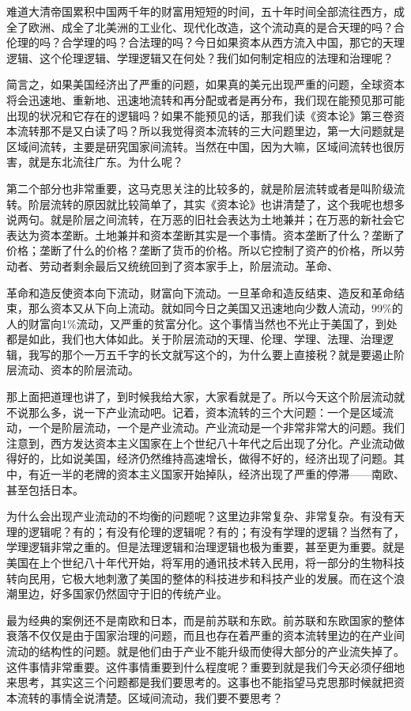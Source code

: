 \documentclass[UTF8, 12pt, a4paper]{ctexrep}
\begin{document}
难道大清帝国累积中国两千年的财富用短短的时间，五十年时间全部流往西方，成全了欧洲、成全了北美洲的工业化、现代化改造，这个流动真的是合天理的吗？合伦理的吗？合学理的吗？合法理的吗？今日如果资本从西方流入中国，那它的天理逻辑、这个伦理逻辑、学理逻辑又在何处？我们如何制定相应的法理和治理呢？

简言之，如果美国经济出了严重的问题，如果真的美元出现严重的问题，全球资本将会迅速地、重新地、迅速地流转和再分配或者是再分布，我们现在能预见那可能出现的状况和它存在的逻辑吗？如果不能预见的话，那我们读《资本论》第三卷资本流转那不是又白读了吗？所以我觉得资本流转的三大问题里边，第一大问题就是区域间流转，主要是研究国家间流转。当然在中国，因为大嘛，区域间流转也很厉害，就是东北流往广东。为什么呢？

第二个部分也非常重要，这马克思关注的比较多的，就是阶层流转或者是叫阶级流转。阶层流转的原因就比较简单了，其实《资本论》也讲清楚了，这个我呢也想多说两句。就是阶层之间流转，在万恶的旧社会表达为土地兼并；在万恶的新社会它表达为资本垄断。土地兼并和资本垄断其实是一个事情。资本垄断了什么？垄断了价格；垄断了什么的价格？垄断了货币的价格。所以它控制了资产的价格，所以劳动者、劳动者剩余最后又统统回到了资本家手上，阶层流动。革命、

革命和造反使资本向下流动，财富向下流动。一旦革命和造反结束、造反和革命结束，那么资本又从下向上流动。就如同今日之美国又迅速地向少数人流动，99\%的人的财富向1\%流动，又严重的贫富分化。这个事情当然也不光止于美国了，到处都是如此，我们也大体如此。关于阶层流动的天理、伦理、学理、法理、治理逻辑，我写的那个一万五千字的长文就写这个的，为什么要上直接税？就是要遏止阶层流动、资本的阶层流动。

那上面把道理也讲了，到时候我给大家，大家看就是了。所以今天这个阶层流动就不说那么多，说一下产业流动吧。记着，资本流转的三个大问题：一个是区域流动，一个是阶层流动，一个是产业流动。产业流动是一个非常非常大的问题。我们注意到，西方发达资本主义国家在上个世纪八十年代之后出现了分化。产业流动做得好的，比如说美国，经济仍然维持高速增长，做得不好的，经济出现了问题。其中，有近一半的老牌的资本主义国家开始掉队，经济出现了严重的停滞——南欧、甚至包括日本。

为什么会出现产业流动的不均衡的问题呢？这里边非常复杂、非常复杂。有没有天理的逻辑呢？有的；有没有伦理的逻辑呢？有的；有没有学理的逻辑？当然有了，学理逻辑非常之重的。但是法理逻辑和治理逻辑也极为重要，甚至更为重要。就是美国在上个世纪八十年代开始，将军用的通讯技术转入民用，将一部分的生物科技转向民用，它极大地刺激了美国的整体的科技进步和科技产业的发展。而在这个浪潮里边，好多国家仍然固守于旧的传统产业。

最为经典的案例还不是南欧和日本，而是前苏联和东欧。前苏联和东欧国家的整体衰落不仅仅是由于国家治理的问题，而且也存在着严重的资本流转里边的在产业间流动的结构性的问题。就是他们由于产业不能升级而使得大部分的产业流失掉了。这件事情非常重要。这件事情重要到什么程度呢？重要到就是我们今天必须仔细地来思考，其实这三个问题都是我们要思考的。这事也不能指望马克思那时候就把资本流转的事情全说清楚。区域间流动，我们要不要思考？
\end{document}
